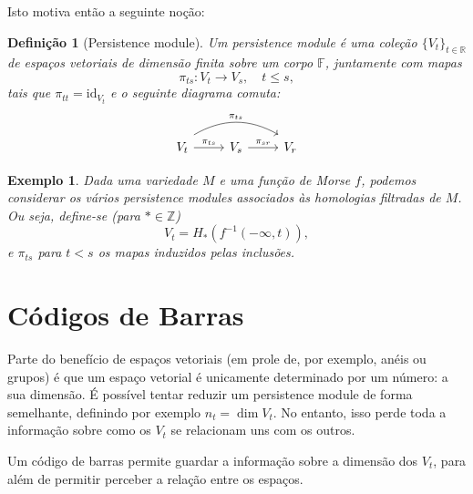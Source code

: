 \documentclass[11pt]{article}
\newtheorem{definition}{Definição}
\newtheorem{ex}{Exemplo}
\theoremstyle{nonumberplain}
\newcommand{\R}{\mathbb{R}}
\newcommand{\Z}{\mathbb{Z}}
\newcommand{\FF}{\mathbb{F}}
\newcommand{\id}{\mathrm{id}}
\begin{document}
Isto motiva então a seguinte noção:

\begin{definition}[Persistence module]
Um \emph{persistence module} é uma coleção $\{V_t\}_{t \in \R}$ de espaços vetoriais de dimensão finita sobre um corpo $\FF$, juntamente com mapas
\begin{equation}
\pi_{ts} \colon V_t \to V_s, \quad t \leq s,
\end{equation}
tais que $\pi_{tt} = \id_{V_t}$ e o seguinte diagrama comuta:
\begin{equation}
\begin{tikzcd}
V_t \arrow[r, "\pi_{ts}"] \arrow[rr, "\pi_{ts}", bend left, shift left=2] & V_s \arrow[r, "\pi_{sr}"] & V_r
\end{tikzcd}
\end{equation}
\end{definition}

\begin{ex}\label{homfil}
Dada uma variedade $M$ e uma função de Morse $f$, podemos considerar os vários persistence modules associados às homologias filtradas de $M$. Ou seja, define-se (para $* \in \Z$)
\begin{equation}
V_t = H_*(f^{-1}(-\infty, t)),
\end{equation}
e $\pi_{ts}$ para $t<s$ os mapas induzidos pelas inclusões.
\end{ex}

\section{Códigos de Barras}

Parte do benefício de espaços vetoriais (em prole de, por exemplo, anéis ou grupos) é que um espaço vetorial é unicamente determinado por um número: a sua dimensão. É possível tentar reduzir um persistence module de forma semelhante, definindo por exemplo $n_t = \dim V_t$. No entanto, isso perde toda a informação sobre como os $V_t$ se relacionam uns com os outros.

Um código de barras permite guardar a informação sobre a dimensão dos $V_t$, para além de permitir perceber a relação entre os espaços.
\end{document}
